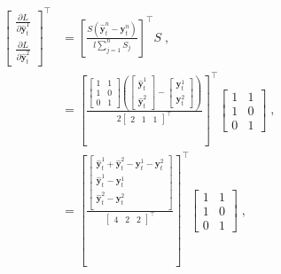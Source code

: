 \documentclass[preprint, 3p, times, twocolumn]{elsarticle}
\begin{document}
\begin{align} 
  \begin{bmatrix}
  \frac{\partial L}{\partial \hat{\textbf{y}}^1_{t}} \\
  \frac{\partial L}{\partial \hat{\textbf{y}}^2_{t}}
  \end{bmatrix}^\intercal 
  &= \left[ \frac{S(\hat{\textbf{y}}^n_{t} - \textbf{y}^n_{t})}{l \sum_{j=1}^n S_{j}} \right]^\intercal S  \;, \nonumber \\
  &=  \left[ \frac{
    \begin{bmatrix}
      1 &1 \\
      1 &0 \\
      0 &1
    \end{bmatrix}
    \left(  
    \begin{bmatrix}
      \hat{\textbf{y}}^1_{t} \\
      \hat{\textbf{y}}^2_{t}
    \end{bmatrix}  
    - 
    \begin{bmatrix}
      \textbf{y}^1_{t} \\
      \textbf{y}^2_{t}
    \end{bmatrix}  
    \right)
    }{2 
    \begin{bmatrix}
      2 &1 &1
    \end{bmatrix}^\intercal  
    } \right]^\intercal
    \begin{bmatrix}
      1 &1 \\
      1 &0 \\
      0 &1
    \end{bmatrix}  \;, \nonumber \\
  &=  \left[ \frac{
    \begin{bmatrix}
      \hat{\textbf{y}}^1_{t} + \hat{\textbf{y}}^2_{t} - \textbf{y}^1_{t} - \textbf{y}^2_{t} \\
      \hat{\textbf{y}}^1_{t} - \textbf{y}^1_{t} \\
      \hat{\textbf{y}}^2_{t} - \textbf{y}^2_{t} \\
    \end{bmatrix}
    }{ 
    \begin{bmatrix}
      4 &2 &2
    \end{bmatrix}^\intercal  
    } \right]^\intercal
    \begin{bmatrix}
      1 &1 \\
      1 &0 \\
      0 &1
    \end{bmatrix}  \;, \nonumber \\

\end{align}
\end{document}
